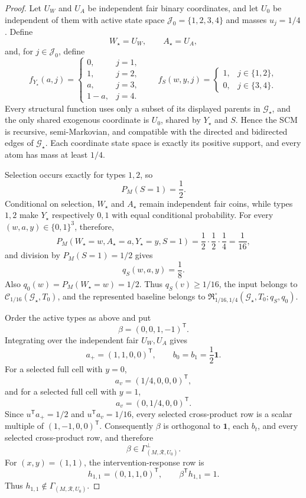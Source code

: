 \documentclass{article}
\begin{document}
\begin{proof}
Let \(U_W\) and \(U_A\) be independent fair binary coordinates, and let \(U_0\) be independent of them with active state space \(\mathcal J_0=\{1,2,3,4\}\) and masses \(u_j=1/4\).  Define
\[
 W_\star=U_W,
 \qquad A_\star=U_A,
\]
and, for \(j\in\mathcal J_0\), define
\[
 f_{Y_\star}(a,j)=
 \begin{cases}
 0,&j=1,\\
 1,&j=2,\\
 a,&j=3,\\
 1-a,&j=4.
 \end{cases}
\qquad
 f_S(w,y,j)=
 \begin{cases}
 1,&j\in\{1,2\},\\
 0,&j\in\{3,4\}.
 \end{cases}
\]
Every structural function uses only a subset of its displayed parents in \(\mathcal G_\star\), and the only shared exogenous coordinate is \(U_0\), shared by \(Y_\star\) and \(S\).  Hence the SCM is recursive, semi-Markovian, and compatible with the directed and bidirected edges of \(\mathcal G_\star\).  Each coordinate state space is exactly its positive support, and every atom has mass at least \(1/4\).

Selection occurs exactly for types \(1,2\), so
\[
 P_M(S=1)=\frac12.
\]
Conditional on selection, \(W_\star\) and \(A_\star\) remain independent fair coins, while types \(1,2\) make \(Y_\star\) respectively \(0,1\) with equal conditional probability.  For every \((w,a,y)\in\{0,1\}^3\), therefore,
\[
 P_M(W_\star=w,A_\star=a,Y_\star=y,S=1)
 =\frac12\cdot\frac12\cdot\frac14=\frac1{16},
\]
and division by \(P_M(S=1)=1/2\) gives
\[
 q_S(w,a,y)=\frac18.
\]
Also \(q_0(w)=P_M(W_\star=w)=1/2\).  Thus \(q_S(v)\geq1/16\), the input belongs to \(\mathcal C_{1/16}(\mathcal G_\star,T_0)\), and the represented baseline belongs to \(\mathfrak R_{1/16,1/4}^{\circ}(\mathcal G_\star,T_0;q_S,q_0)\).

Order the active types as above and put
\[
 \beta=(0,0,1,-1)^{\mathsf T}.
\]
Integrating over the independent fair \(U_W,U_A\) gives
\[
 a_+=(1,1,0,0)^{\mathsf T},
 \qquad b_0=b_1=\frac12\mathbf 1.
\]
For a selected full cell with \(y=0\),
\[
 a_v=(1/4,0,0,0)^{\mathsf T},
\]
and for a selected full cell with \(y=1\),
\[
 a_v=(0,1/4,0,0)^{\mathsf T}.
\]
Since \(u^{\mathsf T}a_+=1/2\) and \(u^{\mathsf T}a_v=1/16\), every selected cross-product row is a scalar multiple of \((1,-1,0,0)^{\mathsf T}\).  Consequently \(\beta\) is orthogonal to \(\mathbf 1\), each \(b_t\), and every selected cross-product row, and therefore
\[
 \beta\in\Gamma_{(M,\mathcal R,U_0)}^\perp.
\]
For \((x,y)=(1,1)\), the intervention-response row is
\[
 h_{1,1}=(0,1,1,0)^{\mathsf T},
 \qquad
 \beta^{\mathsf T}h_{1,1}=1.
\]
Thus \(h_{1,1}\notin\Gamma_{(M,\mathcal R,U_0)}\).


\end{proof}
\end{document}
